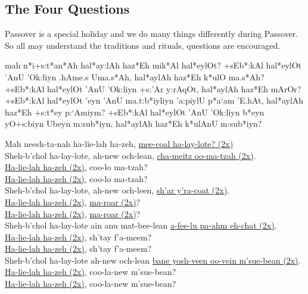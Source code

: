 \documentclass[12pt]{article}
\newenvironment{hebrewPrayer}
    {\begin{cjhebrew}
     \Large
    }
    { 
    \end{cjhebrew}
    }
\newenvironment{hebrewTransliteration}{}{\par}
\begin{document}
\subsection*{The Four Questions}
Passover is a special holiday and we do many things differently during Passover.  So all may understand the traditions and rituals, questions are encouraged.

\begin{minipage}[t]{\textwidth}
    \begin{hebrewPrayer}
        mah n*i+s:t*an*Ah hal*ay:lAh haz*Eh mik*Al hal*eylOt\textrm{?} +sEb*:kAl hal*eylOt 'AnU 'Ok:liyn .hAme.s Uma.s*Ah\textrm{,} hal*aylAh haz*Eh k*ulO ma.s*Ah\textrm{?} +sEb*:kAl hal*eylOt 'AnU 'Ok:liyn +s:'Ar y:rAqOt\textrm{,} hal*aylAh haz*Eh mArOr\textrm{?} +sEb*:kAl hal*eylOt 'eyn 'AnU ma.t:b*iyliyn 'a:piylU p*a`am 'E.hAt\textrm{,} hal*aylAh haz*Eh +s:t*ey p:`Amiym\textrm{?} +sEb*:kAl hal*eylOt 'AnU 'Ok:liyn b*eyn yO+s:biyn Ubeyn m:sub*iyn\textrm{,} hal*aylAh haz*Eh k*ulAnU m:sub*iyn\textrm{?}
    \end{hebrewPrayer}

    \begin{hebrewTransliteration}
        Mah neesh-ta-nah ha-lie-lah ha-zeh, \underline{mee-coal ha-lay-lote? (2x)} \\
        Sheh-b'chol ha-lay-lote, ah-new och-lean, \underline{cha-meitz oo-ma-tzah (2x)}. \\
        \underline{Ha-lie-lah ha-zeh (2x)}, coo-lo ma-tzah? \\
        \underline{Ha-lie-lah ha-zeh (2x)}, coo-lo ma-tzah? \\
        Sheh-b'chol ha-lay-lote, ah-new och-leen, \underline{sh'ar y'ra-coat (2x)}. \\
        \underline{Ha-lie-lah ha-zeh (2x)}, \underline{ma-roar (2x)}? \\
        \underline{Ha-lie-lah ha-zeh (2x)}, \underline{ma-roar (2x)}? \\
        Sheh-b'chol ha-lay-lote ain anu mat-bee-lean \underline{a-fee-lu pa-ahm eh-chat (2x)}. \\
        \underline{Ha-lie-lah ha-zeh (2x)}, sh'tay f'a-meem? \\
        \underline{Ha-lie-lah ha-zeh (2x)}, sh'tay f'a-meem? \\
        Sheh-b'chol ha-lay-lote ah-new och-lean \underline{bane yosh-veen oo-vein m'sue-bean (2x)}. \\
        \underline{Ha-lie-lah ha-zeh (2x)}, coo-la-new m'sue-bean? \\
        \underline{Ha-lie-lah ha-zeh (2x)}, coo-la-new m'sue-bean?
    \end{hebrewTransliteration}
\end{minipage}
\end{document}
